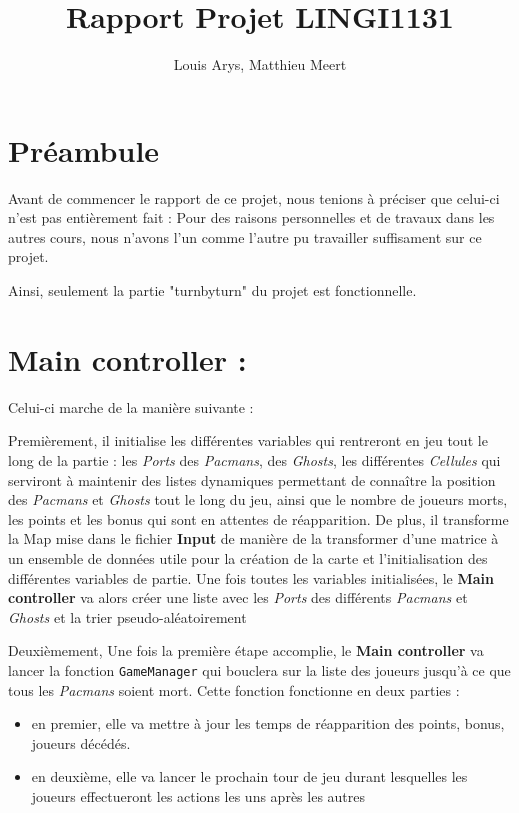 \documentclass[a4paper, 11pt]{article}
\date
\author{Louis Arys, Matthieu Meert}
\title{Rapport Projet LINGI1131}
\begin{document}
\maketitle
\tableofcontents

\section{Préambule}

Avant de commencer le rapport de ce projet, nous tenions à préciser que celui-ci n'est pas entièrement fait : Pour des raisons personnelles et de travaux dans les autres cours, nous n'avons l'un comme l'autre pu travailler suffisament sur ce projet.

Ainsi, seulement la partie "turnbyturn" du projet est fonctionnelle.

\section{Main controller :}

Celui-ci marche de la manière suivante : 

Premièrement, il initialise les différentes variables qui rentreront en jeu tout le long de la partie : les \textit{Ports} des \textit{Pacmans}, des \textit{Ghosts}, les différentes \textit{Cellules} qui serviront à maintenir des listes dynamiques permettant de connaître la position des \textit{Pacmans} et \textit{Ghosts} tout le long du jeu, ainsi que le nombre de joueurs morts, les points et les bonus qui sont en attentes de réapparition.  De plus, il transforme la Map mise dans le fichier \textbf{Input} de manière de la transformer d'une matrice à un ensemble de données utile pour la création de la carte et l'initialisation des différentes variables de partie.  Une fois toutes les variables initialisées, le \textbf{Main controller} va alors créer une liste avec les \textit{Ports} des différents \textit{Pacmans} et \textit{Ghosts} et la trier pseudo-aléatoirement

Deuxièmement, Une fois la première étape accomplie, le \textbf{Main controller} va lancer la fonction \texttt{GameManager} qui bouclera sur la liste des joueurs jusqu'à ce que tous les \textit{Pacmans} soient mort.  Cette fonction fonctionne en deux parties :

\begin{itemize}
\item en premier, elle va mettre à jour les temps de réapparition des points, bonus, joueurs décédés.
\item en deuxième, elle va lancer le prochain tour de jeu durant lesquelles les joueurs effectueront les actions les uns après les autres
\end{itemize}
\end{document}
